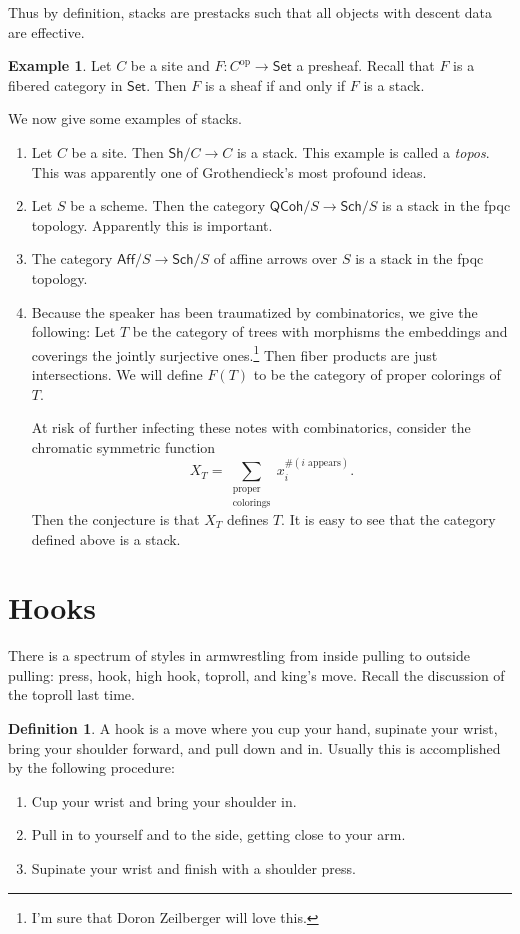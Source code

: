 \documentclass[leqno, openany]{memoir}
\theoremstyle{definition}
\newtheorem{defn}[thm]{Definition}
\newtheorem{exm}[thm]{Example}
\theoremstyle{remark}
\theoremstyle{plain}
\theoremstyle{definition}
\theoremstyle{remark}
\newcommand{\mr}[1]{\mathrm{#1}}
\newcommand{\ms}[1]{\mathsf{#1}}
\begin{document}
Thus by definition, stacks are prestacks such that all objects with descent data are effective.

\begin{exm}
    Let $C$ be a site and $F \colon C^{\mr{op}} \to \ms{Set}$ a presheaf. Recall that $F$ is a fibered category in $\ms{Set}$. Then $F$ is a sheaf if and only if $F$ is a stack.
\end{exm}

We now give some examples of stacks.

\begin{enumerate}
    \item Let $C$ be a site. Then $\ms{Sh}/C \to C$ is a stack. This example is called a \textit{topos}. This was apparently one of Grothendieck's most profound ideas.
    \item Let $S$ be a scheme. Then the category $\ms{QCoh}/S \to \ms{Sch}/S$ is a stack in the fpqc topology. Apparently this is important.
    \item The category $\ms{Aff}/S \to \ms{Sch}/S$ of affine arrows over $S$ is a stack in the fpqc topology.
    \item Because the speaker has been traumatized by combinatorics, we give the following: Let $T$ be the category of trees with morphisms the embeddings and coverings the jointly surjective ones.\footnote{I'm sure that Doron Zeilberger will love this.} Then fiber products are just intersections. We will define $F(T)$ to be the category of proper colorings of $T$.

        At risk of further infecting these notes with combinatorics, consider the chromatic symmetric function
        \[ X_T = \sum_{\substack{\text{proper} \\ \text{colorings}}} x_i^{\#(i\text{ appears})}. \]
        Then the conjecture is that $X_T$ defines $T$. It is easy to see that the category defined above is a stack.
\end{enumerate}

\section{Hooks}%
\label{sec:hooks}

There is a spectrum of styles in armwrestling from inside pulling to outside pulling: press, hook, high hook, toproll, and king's move. Recall the discussion of the toproll last time. 

\begin{defn}
    A hook is a move where you cup your hand, supinate your wrist, bring your shoulder forward, and pull down and in. Usually this is accomplished by the following procedure:
    \begin{enumerate}
        \item Cup your wrist and bring your shoulder in.
        \item Pull in to yourself and to the side, getting close to your arm.
        \item Supinate your wrist and finish with a shoulder press.
    \end{enumerate}
\end{defn}
\end{document}
